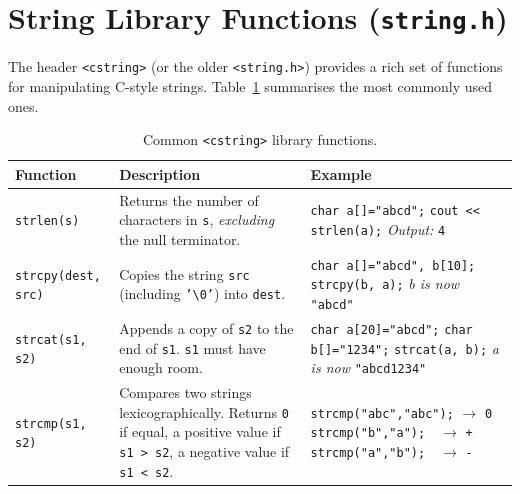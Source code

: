\section{String Library Functions (\texttt{string.h})}
\label{sec:string-lib}

The header \texttt{<cstring>} (or the older \texttt{<string.h>})
provides a rich set of functions for manipulating C-style strings.
Table~\ref{tab:string-funcs} summarises the most commonly used ones.

\begin{table}[htbp]
\centering
\caption{Common \texttt{<cstring>} library functions.}
\label{tab:string-funcs}
\renewcommand{\arraystretch}{1.4}
\begin{tabular}{@{} l p{4.8cm} p{5.5cm} @{}}
\toprule
\textbf{Function} & \textbf{Description} & \textbf{Example} \\
\midrule
\texttt{strlen(s)} &
    Returns the number of characters in \texttt{s}, \emph{excluding}
    the null terminator. &
    \texttt{char a[]="abcd";}\newline
    \texttt{cout << strlen(a);}\newline
    \textit{Output:} \texttt{4} \\
\addlinespace
\texttt{strcpy(dest, src)} &
    Copies the string \texttt{src} (including \texttt{'\textbackslash 0'})
    into \texttt{dest}. &
    \texttt{char a[]="abcd", b[10];}\newline
    \texttt{strcpy(b, a);}\newline
    \textit{b is now} \texttt{"abcd"} \\
\addlinespace
\texttt{strcat(s1, s2)} &
    Appends a copy of \texttt{s2} to the end of \texttt{s1}.
    \texttt{s1} must have enough room. &
    \texttt{char a[20]="abcd";}\newline
    \texttt{char b[]="1234";}\newline
    \texttt{strcat(a, b);}\newline
    \textit{a is now} \texttt{"abcd1234"} \\
\addlinespace
\texttt{strcmp(s1, s2)} &
    Compares two strings lexicographically.\newline
    Returns \texttt{0} if equal, a positive value if
    \texttt{s1 > s2}, a negative value if \texttt{s1 < s2}. &
    \texttt{strcmp("abc","abc");} $\rightarrow$ \texttt{0}\newline
    \texttt{strcmp("b","a");}\ \ $\rightarrow$ \texttt{+}\newline
    \texttt{strcmp("a","b");}\ \ $\rightarrow$ \texttt{-} \\
\bottomrule
\end{tabular}
\end{table}

